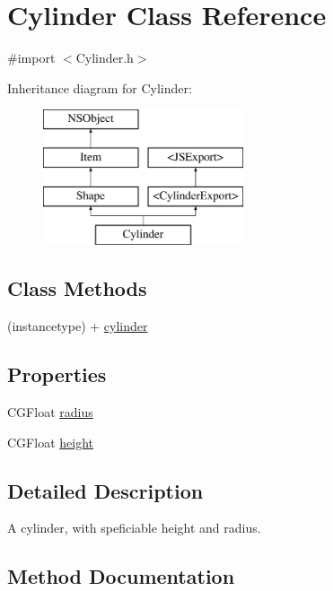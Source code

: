 \hypertarget{interface_cylinder}{}\section{Cylinder Class Reference}
\label{interface_cylinder}


{\ttfamily \#import $<$Cylinder.\+h$>$}

Inheritance diagram for Cylinder\+:\begin{figure}[H]
\begin{center}
\leavevmode
\includegraphics[height=4.000000cm]{interface_cylinder}
\end{center}
\end{figure}
\subsection*{Class Methods}
\begin{DoxyCompactItemize}
\item 
(instancetype) + \hyperlink{interface_cylinder_a483c1eaa8d8a92071408a1e9510b6c45}{cylinder}
\end{DoxyCompactItemize}
\subsection*{Properties}
\begin{DoxyCompactItemize}
\item 
C\+G\+Float \hyperlink{interface_cylinder_a8744572eba222f671510892226eb047a}{radius}
\item 
C\+G\+Float \hyperlink{interface_cylinder_aeac51ffa7b068d0e2fb76137673f2e19}{height}
\end{DoxyCompactItemize}


\subsection{Detailed Description}
A cylinder, with speficiable height and radius. 

\subsection{Method Documentation}
\hypertarget{interface_cylinder_a483c1eaa8d8a92071408a1e9510b6c45}{}
